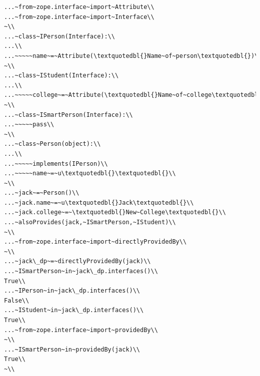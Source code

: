 \documentclass[a4paper,openany,twoside,draft]{book}
\begin{document}
\begin{verbatim}
...~from~zope.interface~import~Attribute\\
...~from~zope.interface~import~Interface\\
~\\
...~class~IPerson(Interface):\\
...\\
...~~~~~name~=~Attribute(\textquotedbl{}Name~of~person\textquotedbl{})\\
~\\
...~class~IStudent(Interface):\\
...\\
...~~~~~college~=~Attribute(\textquotedbl{}Name~of~college\textquotedbl{})\\
~\\
...~class~ISmartPerson(Interface):\\
...~~~~~pass\\
~\\
...~class~Person(object):\\
...\\
...~~~~~implements(IPerson)\\
...~~~~~name~=~u\textquotedbl{}\textquotedbl{}\\
~\\
...~jack~=~Person()\\
...~jack.name~=~u\textquotedbl{}Jack\textquotedbl{}\\
...~jack.college~=~\textquotedbl{}New~College\textquotedbl{}\\
...~alsoProvides(jack,~ISmartPerson,~IStudent)\\
~\\
...~from~zope.interface~import~directlyProvidedBy\\
~\\
...~jack\_dp~=~directlyProvidedBy(jack)\\
...~ISmartPerson~in~jack\_dp.interfaces()\\
True\\
...~IPerson~in~jack\_dp.interfaces()\\
False\\
...~IStudent~in~jack\_dp.interfaces()\\
True\\
...~from~zope.interface~import~providedBy\\
~\\
...~ISmartPerson~in~providedBy(jack)\\
True\\
~\\

\end{verbatim}
\end{document}
